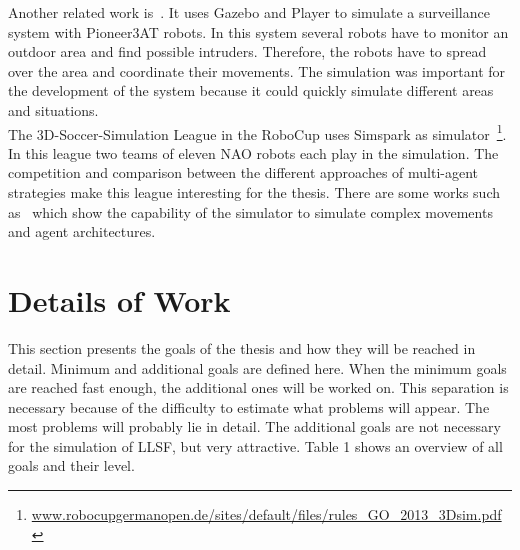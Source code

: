 \documentclass[11pt,a4paper]{article}
\begin{document}
Another related work is~\cite{SurveillanceSystem}. It uses Gazebo and Player to simulate a surveillance system with Pioneer3AT robots. In this system several robots have to monitor an outdoor area and find possible intruders. Therefore, the robots have to spread over the area and coordinate their movements. The simulation was important for the development of the system because it could quickly simulate different areas and situations.\\
The 3D-Soccer-Simulation League in the RoboCup uses Simspark as simulator~\footnote{\url{www.robocupgermanopen.de/sites/default/files/rules_GO_2013_3Dsim.pdf}}. In this league two teams of eleven NAO robots each play in the simulation. The competition and comparison between the different approaches of multi-agent strategies make this league interesting for the thesis. There are some works such as~\cite{SoccerChampion} which show the capability of the simulator to simulate complex movements and agent architectures.

\section{Details of Work}
This section presents the goals of the thesis and how they will be reached in detail. Minimum and additional goals are defined here. When the minimum goals are reached fast enough, the additional ones will be worked on. This separation is necessary because of the difficulty to estimate what problems will appear. The most problems will probably lie in detail. The additional goals are not necessary for the simulation of LLSF, but very attractive. Table 1 shows an overview of all goals and their level.
\end{document}
